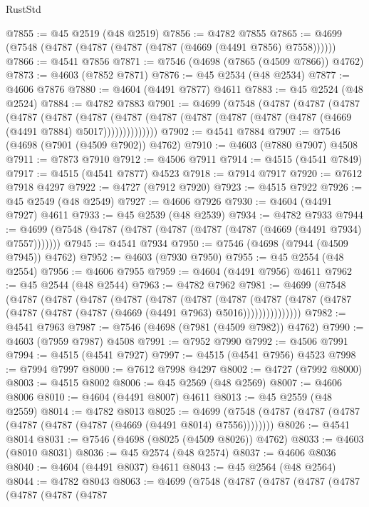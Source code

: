 \begin{lexlean}{RustStd}
\begin{coremodule}
@7855 := @45 @2519 (@48 @2519)
@7856 := @4782 @7855
@7865 := @4699 (@7548 (@4787 (@4787 (@4787 (@4787 (@4669 (@4491 @7856) @7558))))))
@7866 := @4541 @7856
@7871 := @7546 (@4698 (@7865 (@4509 @7866)) @4762)
@7873 := @4603 (@7852 @7871)
@7876 := @45 @2534 (@48 @2534)
@7877 := @4606 @7876
@7880 := @4604 (@4491 @7877) @4611
@7883 := @45 @2524 (@48 @2524)
@7884 := @4782 @7883
@7901 := @4699
    (@7548
      (@4787
        (@4787
          (@4787
            (@4787
              (@4787
                (@4787
                  (@4787 (@4787 (@4787 (@4787 (@4787 (@4787 (@4669 (@4491 @7884) @5017))))))))))))))
@7902 := @4541 @7884
@7907 := @7546 (@4698 (@7901 (@4509 @7902)) @4762)
@7910 := @4603 (@7880 @7907) @4508
@7911 := @7873 @7910
@7912 := @4506 @7911
@7914 := @4515 (@4541 @7849)
@7917 := @4515 (@4541 @7877) @4523
@7918 := @7914 @7917
@7920 := @7612 @7918 @4297
@7922 := @4727 (@7912 @7920)
@7923 := @4515 @7922
@7926 := @45 @2549 (@48 @2549)
@7927 := @4606 @7926
@7930 := @4604 (@4491 @7927) @4611
@7933 := @45 @2539 (@48 @2539)
@7934 := @4782 @7933
@7944 := @4699 (@7548 (@4787 (@4787 (@4787 (@4787 (@4787 (@4669 (@4491 @7934) @7557)))))))
@7945 := @4541 @7934
@7950 := @7546 (@4698 (@7944 (@4509 @7945)) @4762)
@7952 := @4603 (@7930 @7950)
@7955 := @45 @2554 (@48 @2554)
@7956 := @4606 @7955
@7959 := @4604 (@4491 @7956) @4611
@7962 := @45 @2544 (@48 @2544)
@7963 := @4782 @7962
@7981 := @4699
    (@7548
      (@4787
        (@4787
          (@4787
            (@4787
              (@4787
                (@4787
                  (@4787
                    (@4787
                      (@4787 (@4787 (@4787 (@4787 (@4787 (@4669 (@4491 @7963) @5016)))))))))))))))
@7982 := @4541 @7963
@7987 := @7546 (@4698 (@7981 (@4509 @7982)) @4762)
@7990 := @4603 (@7959 @7987) @4508
@7991 := @7952 @7990
@7992 := @4506 @7991
@7994 := @4515 (@4541 @7927)
@7997 := @4515 (@4541 @7956) @4523
@7998 := @7994 @7997
@8000 := @7612 @7998 @4297
@8002 := @4727 (@7992 @8000)
@8003 := @4515 @8002
@8006 := @45 @2569 (@48 @2569)
@8007 := @4606 @8006
@8010 := @4604 (@4491 @8007) @4611
@8013 := @45 @2559 (@48 @2559)
@8014 := @4782 @8013
@8025 := @4699 (@7548 (@4787 (@4787 (@4787 (@4787 (@4787 (@4787 (@4669 (@4491 @8014) @7556))))))))
@8026 := @4541 @8014
@8031 := @7546 (@4698 (@8025 (@4509 @8026)) @4762)
@8033 := @4603 (@8010 @8031)
@8036 := @45 @2574 (@48 @2574)
@8037 := @4606 @8036
@8040 := @4604 (@4491 @8037) @4611
@8043 := @45 @2564 (@48 @2564)
@8044 := @4782 @8043
@8063 := @4699
    (@7548
      (@4787
        (@4787
          (@4787
            (@4787
              (@4787
                (@4787
                  (@4787

\end{coremodule}
\end{lexlean}
